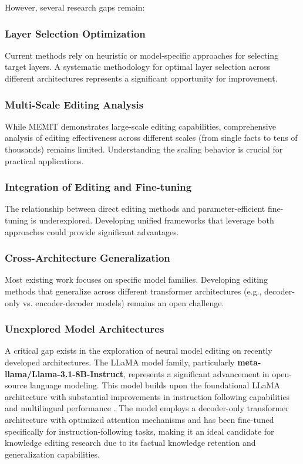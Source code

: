 However, several research gaps remain:

\subsubsection{Layer Selection Optimization}
Current methods rely on heuristic or model-specific approaches for selecting target layers. A systematic methodology for optimal layer selection across different architectures represents a significant opportunity for improvement.

\subsubsection{Multi-Scale Editing Analysis}
While MEMIT demonstrates large-scale editing capabilities, comprehensive analysis of editing effectiveness across different scales (from single facts to tens of thousands) remains limited. Understanding the scaling behavior is crucial for practical applications.

\subsubsection{Integration of Editing and Fine-tuning}
The relationship between direct editing methods and parameter-efficient fine-tuning is underexplored. Developing unified frameworks that leverage both approaches could provide significant advantages.

\subsubsection{Cross-Architecture Generalization}
Most existing work focuses on specific model families. Developing editing methods that generalize across different transformer architectures (e.g., decoder-only vs. encoder-decoder models) remains an open challenge.

\subsubsection{Unexplored Model Architectures}
A critical gap exists in the exploration of neural model editing on recently developed architectures. The LLaMA model family, particularly \textbf{meta-llama/Llama-3.1-8B-Instruct}, represents a significant advancement in open-source language modeling. This model builds upon the foundational LLaMA architecture with substantial improvements in instruction following capabilities and multilingual performance \cite{dubey_2024_llama3}. The model employs a decoder-only transformer architecture with optimized attention mechanisms and has been fine-tuned specifically for instruction-following tasks, making it an ideal candidate for knowledge editing research due to its factual knowledge retention and generalization capabilities.

